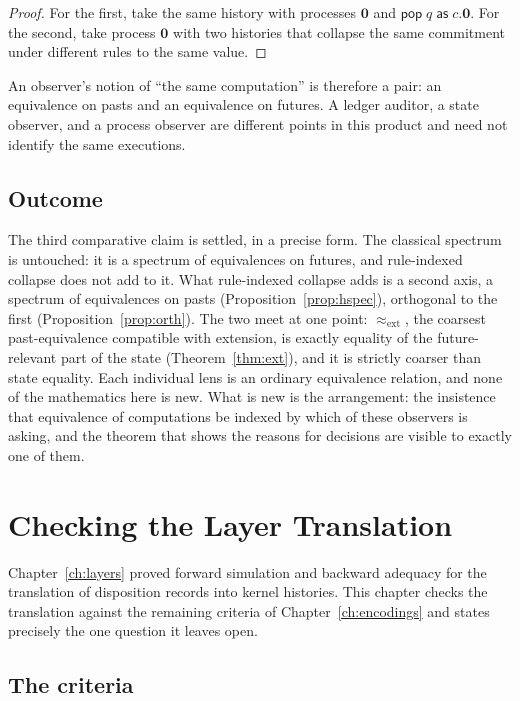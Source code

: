 \documentclass[11pt,openany]{book}
\theoremstyle{remark}
\begin{document}
\begin{proof}
For the first, take the same history with processes $\mathbf 0$ and
$\mathsf{pop}\;q\;\mathsf{as}\;c.\mathbf 0$. For the second, take process
$\mathbf 0$ with two histories that collapse the same commitment under
different rules to the same value.
\end{proof}

An observer's notion of ``the same computation'' is therefore a pair: an
equivalence on pasts and an equivalence on futures. A ledger auditor, a
state observer, and a process observer are different points in this
product and need not identify the same executions.

\section{Outcome}

The third comparative claim is settled, in a precise form. The classical
spectrum is untouched: it is a spectrum of equivalences on futures, and
rule-indexed collapse does not add to it. What rule-indexed collapse adds
is a second axis, a spectrum of equivalences on pasts
(Proposition~\ref{prop:hspec}), orthogonal to the first
(Proposition~\ref{prop:orth}). The two meet at one point:
$\approx_{\mathrm{ext}}$, the coarsest past-equivalence compatible with
extension, is exactly equality of the future-relevant part of the state
(Theorem~\ref{thm:ext}), and it is strictly coarser than state equality.
Each individual lens is an ordinary equivalence relation, and none of the
mathematics here is new. What is new is the arrangement: the insistence
that equivalence of computations be indexed by which of these observers
is asking, and the theorem that shows the reasons for decisions are
visible to exactly one of them.

\chapter{Checking the Layer Translation}
\label{ch:layers-back}

Chapter~\ref{ch:layers} proved forward simulation and backward adequacy
for the translation of disposition records into kernel histories. This
chapter checks the translation against the remaining criteria of
Chapter~\ref{ch:encodings} and states precisely the one question it
leaves open.

\section{The criteria}
\end{document}
